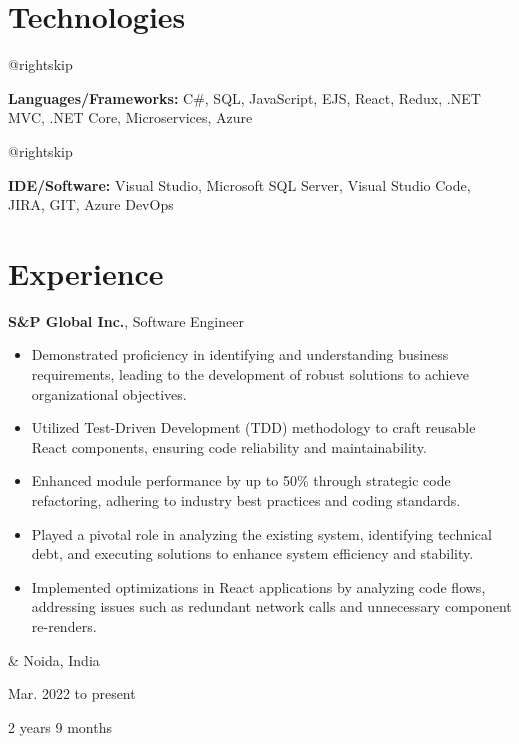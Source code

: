 \documentclass[10pt, letterpaper]{article}
\newenvironment{highlights}{
        \begin{itemize}[
                topsep=0pt,
                parsep=0.10cm,
                partopsep=0pt,
                itemsep=0pt,
                after=\vspace{-1\baselineskip},
                leftmargin=0.4cm + 3pt
            ]
    }{
        \end{itemize}
    } %
\let\originalTabularx\tabularx
\let\originalEndTabularx\endtabularx
\renewenvironment{tabularx}{\bgroup\centering\originalTabularx}{\originalEndTabularx\par\egroup}
\begin{document}
    
    \section{Technologies}

        \begingroup\leftskip=0.2cm
        \advance\csname @rightskip\endcsname 0.2cm
        \advance\rightskip 0.2cm

        \textbf{Languages/Frameworks:} C\#, SQL, JavaScript, EJS, React, Redux, .NET MVC, .NET Core, Microservices, Azure \par\endgroup

        \vspace{0.2cm}
        \begingroup\leftskip=0.2cm
        \advance\csname @rightskip\endcsname 0.2cm
        \advance\rightskip 0.2cm

        \textbf{IDE/Software:} Visual Studio, Microsoft SQL Server, Visual Studio Code, JIRA, GIT, Azure DevOps \par\endgroup


    
    \section{Experience}

        \begin{tabularx}{
            \textwidth-0.4 cm-0.13cm
        }{
            K{0.2cm}
            R{4.1cm}
        }
            \textbf{S\&P Global Inc.}, Software Engineer

            \vspace{0.10cm}

            \begin{highlights}
                \item Demonstrated proficiency in identifying and understanding business requirements, leading to the development of robust solutions to achieve organizational objectives.
                \item Utilized Test-Driven Development (TDD) methodology to craft reusable React components, ensuring code reliability and maintainability.
                \item Enhanced module performance by up to 50\% through strategic code refactoring, adhering to industry best practices and coding standards.
                \item Played a pivotal role in analyzing the existing system, identifying technical debt, and executing solutions to enhance system efficiency and stability.
                \item Implemented optimizations in React applications by analyzing code flows, addressing issues such as redundant network calls and unnecessary component re-renders.
            \end{highlights}
            &
            Noida, India

            Mar. 2022 to present

            2 years 9 months
        \end{tabularx}
\end{document}
